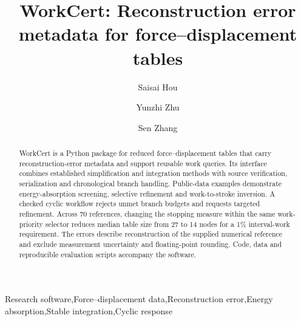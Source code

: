\documentclass[preprint,12pt,a4paper]{elsarticle}
\begin{document}
\begin{frontmatter}
\title{WorkCert: Reconstruction error metadata for force--displacement tables}
\author[a]{Saisai Hou}\author[a]{Yunzhi Zhu}\author[a]{Sen Zhang}
\begin{abstract}
WorkCert is a Python package for reduced force--displacement tables that carry reconstruction-error metadata and support reusable work queries. Its interface combines established simplification and integration methods with source verification, serialization and chronological branch handling. Public-data examples demonstrate energy-absorption screening, selective refinement and work-to-stroke inversion. A checked cyclic workflow rejects unmet branch budgets and requests targeted refinement. Across 70 references, changing the stopping measure within the same work-priority selector reduces median table size from 27 to 14 nodes for a 1\% interval-work requirement. The errors describe reconstruction of the supplied numerical reference and exclude measurement uncertainty and floating-point rounding. Code, data and reproducible evaluation scripts accompany the software.
\end{abstract}
\begin{keyword}Research software\sep Force--displacement data\sep Reconstruction error\sep Energy absorption\sep Stable integration\sep Cyclic response\end{keyword}
\end{frontmatter}\clearpage
\end{document}
